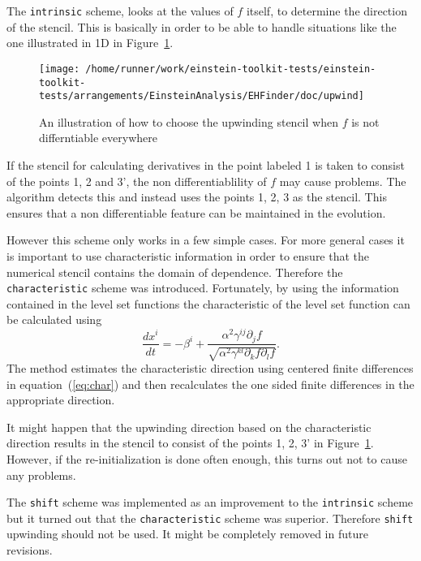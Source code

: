 The {\tt intrinsic} scheme, looks at the values of $f$ itself, to determine
the direction of the stencil. This is basically in order to be able to handle
situations like the one illustrated in 1D in
Figure~\ref{AEIThorns_EHFinder_upwindfig}.
\begin{figure}[ht]
  \begin{center}
    \texttt{[image: /home/runner/work/einstein-toolkit-tests/einstein-toolkit-tests/arrangements/EinsteinAnalysis/EHFinder/doc/upwind]}
  \end{center}
  \caption{An illustration of how to choose the upwinding stencil when $f$
           is not differntiable everywhere}
  \label{AEIThorns_EHFinder_upwindfig}
\end{figure}
If the stencil for calculating derivatives in the point labeled 1 is taken
to consist of the points 1, 2 and 3', the non differentiablility of $f$ may
cause problems. The algorithm detects this and instead uses the points 1, 2, 3
as the stencil. This ensures that a non differentiable feature can be
maintained in the evolution.

However this scheme only works in a few simple cases. For more general cases
it is important to use characteristic information in order to ensure that
the numerical stencil contains the domain of dependence. Therefore the
{\tt characteristic} scheme was introduced. Fortunately, by using the
information contained in the level set functions the characteristic of
the level set function can be calculated using
\begin{equation}
\frac{dx^{i}}{dt}=-\beta^{i}+\frac{\alpha^{2}\gamma^{ij}\partial_{j}f}
{\sqrt{\alpha^{2}\gamma^{kl}\partial_{k}f\partial_{l}f}}. 
\label{eq:char}
\end{equation}
The method estimates the characteristic direction using centered finite
differences in equation~(\ref{eq:char}) and then recalculates the one
sided finite differences in the appropriate direction.

It might happen that the upwinding direction based on the characteristic
direction results in the stencil to consist of the points 1, 2, 3' in 
Figure~\ref{AEIThorns_EHFinder_upwindfig}. However, if the 
re-initialization is done often enough, this turns out not to cause
any problems.

The {\tt shift} scheme was implemented as an improvement to the {\tt intrinsic}
scheme but it turned out that the {\tt characteristic} scheme was superior.
Therefore {\tt shift} upwinding should not be used. It might be completely
removed in future revisions.

